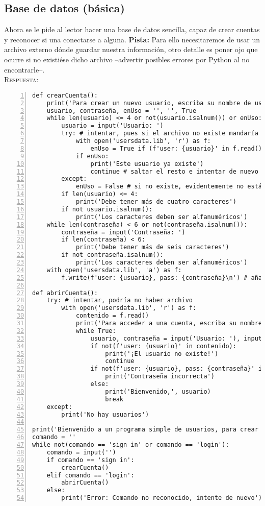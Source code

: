 \documentclass[11pt,twoside]{report}
\begin{document}
\subsection*{Base de datos (básica)}
Ahora se le pide al lector hacer una base de datos sencilla, capaz de crear cuentas y reconocer si una conectarse a alguna. \textbf{Pista:} Para ello necesitaremos de usar un archivo externo dónde guardar nuestra información, otro detalle es poner ojo que ocurre si no existiése dicho archivo --advertir posibles errores por Python al no encontrarle--.\\
\textsc{Respuesta:}
\begin{lstlisting}[numbers=left]
def crearCuenta():
	print('Para crear un nuevo usuario, escriba su nombre de usuario y contraseña')
	usuario, contraseña, enUso = '', '', True 
	while len(usuario) <= 4 or not(usuario.isalnum()) or enUso: # mientras el usuario tenga pocos caracteres, no sean alfanuméricos o este en uso, repetir
		usuario = input('Usuario: ')
		try: # intentar, pues si el archivo no existe mandaría error
			with open('usersdata.lib', 'r') as f:
				enUso = True if (f'user: {usuario}' in f.read()) else False # ¿está el usuario ya en uso?
			if enUso:
				print('Este usuario ya existe')
				continue # saltar el resto e intentar de nuevo
		except:
			enUso = False # si no existe, evidentemente no está en uso
		if len(usuario) <= 4:
			print('Debe tener más de cuatro caracteres')
		if not usuario.isalnum():
			print('Los caracteres deben ser alfanuméricos')
	while len(contraseña) < 6 or not(contraseña.isalnum()):
		contraseña = input('Contraseña: ')
		if len(contraseña) < 6:
			print('Debe tener más de seis caracteres')
		if not contraseña.isalnum():
			print('Los caracteres deben ser alfanuméricos')
	with open('usersdata.lib', 'a') as f:
		f.write(f'user: {usuario}, pass: {contraseña}\n') # añadir nuevo usuario con su correspondiente contraseña

def abrirCuenta():
	try: # intentar, podría no haber archivo
		with open('usersdata.lib', 'r') as f:
			contenido = f.read()
			print('Para acceder a una cuenta, escriba su nombre y su usuario')
			while True:
				usuario, contraseña = input('Usuario: '), input('Contraseña: ')
				if not(f'user: {usuario}' in contenido):
					print('¡El usuario no existe!')
					continue
				if not(f'user: {usuario}, pass: {contraseña}' in contenido):
					print('Contraseña incorrecta')
				else:
					print('Bienvenido,', usuario)
					break 
	except:
		print('No hay usuarios')

print('Bienvenido a un programa simple de usuarios, para crear un nuevo usuario escriba "sign in", para acceder a uno escriba "login"')
comando = ''
while not(comando == 'sign in' or comando == 'login'):
	comando = input('')
	if comando == 'sign in':
		crearCuenta()
	elif comando == 'login':
		abrirCuenta()
	else:
		print('Error: Comando no reconocido, intente de nuevo')
\end{lstlisting}
\end{document}
